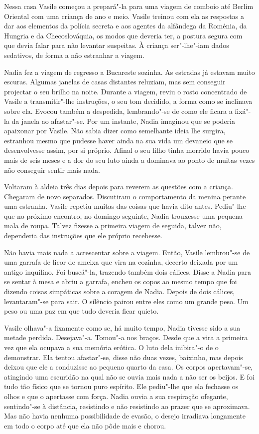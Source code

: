 Nessa casa Vasile começou a prepará"-la para uma viagem de comboio até
Berlim Oriental com uma criança de ano e meio. Vasile treinou com ela as
respostas a dar aos elementos da polícia secreta e aos agentes da
alfândega da Roménia, da Hungria e da Checoslováquia, os modos que
deveria ter, a postura segura com que devia falar para não levantar
suspeitas. À criança ser"-lhe"-iam dados sedativos, de forma a não
estranhar a viagem.

Nadia fez a viagem de regresso a Bucareste sozinha. As estradas já
estavam muito escuras. Algumas janelas de
casas distantes reluziam, mas sem conseguir projectar o seu brilho na
noite. Durante a viagem, reviu o rosto concentrado de Vasile a
transmitir"-lhe instruções, o seu tom decidido, a forma como se inclinava
sobre ela. Evocou também a despedida, lembrando"-se de como ele ficara a
fixá"-la da janela ao afastar"-se. Por um instante, Nadia imaginou que
se poderia apaixonar por Vasile. Não sabia dizer como semelhante ideia
lhe surgira, estranhou mesmo que pudesse haver ainda na sua vida um
devaneio que se desenvolvesse assim, por si próprio. Afinal o seu
filho tinha morrido havia pouco mais de seis meses e a dor do seu luto
ainda a dominava ao ponto de muitas vezes não conseguir sentir mais
nada.

Voltaram à aldeia três dias depois para reverem as questões com a
criança. Chegaram de novo separados. Discutiram o comportamento da
menina perante uma estranha. Vasile repetiu muitas das coisas que havia
dito antes. Pediu"-lhe que no próximo encontro, no domingo seguinte,
Nadia trouxesse uma pequena mala de roupa. Talvez fizesse a primeira
viagem de seguida, talvez não, dependeria das instruções que ele
próprio recebesse.

Não havia mais nada a acrescentar sobre a viagem. Então, Vasile
lembrou"-se de uma garrafa de licor de ameixa que vira na cozinha,
decerto deixada por um antigo inquilino. Foi buscá"-la, trazendo também
dois cálices. Disse a Nadia para se sentar à mesa e abriu a garrafa,
encheu os copos ao mesmo tempo que foi dizendo coisas simpáticas sobre a
coragem de Nadia. Depois de dois cálices, levantaram"-se para sair. O
silêncio pairou entre eles como um grande peso. Um peso ou uma paz em
que tudo deveria ficar quieto.

Vasile olhava"-a fixamente como se, há muito tempo, Nadia tivesse sido a
sua metade perdida. Desejava"-a. Tomou"-a nos braços. Desde que a vira a
primeira vez que ela ocupava a sua memória erótica. O luto dela
inibira"-o de o demonstrar. Ela tentou afastar"-se, disse não duas vezes,
baixinho, mas depois deixou que ele a conduzisse ao pequeno quarto da
casa. Os corpos apertavam"-se, atingindo uma escuridão na qual não se
ouvia mais nada a não ser os beijos. E foi tudo tão físico que se tornou
puro espírito. Ele pediu"-lhe que ela fechasse os olhos e que o apertasse com força. Nadia ouvia a sua respiração ofegante, sentindo"-se à
distância, resistindo e não resistindo ao prazer que se aproximava. Mas
não havia nenhuma possibilidade de evasão, o desejo irradiava longamente
em todo o corpo até que ela não pôde mais e chorou.

